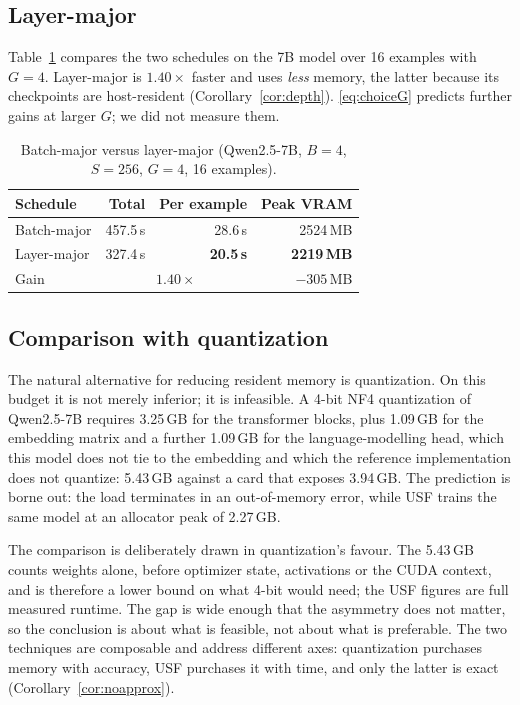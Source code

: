\documentclass[preprint,12pt]{elsarticle}
\newcommand{\usf}{USF}
\begin{document}
\subsection{Layer-major}

Table~\ref{tab:lm} compares the two schedules on the 7B model over 16 examples with $G=4$. Layer-major
is $1.40\times$ faster and uses \emph{less} memory, the latter because its checkpoints are
host-resident (Corollary~\ref{cor:depth}). \eqref{eq:choiceG} predicts further gains at larger $G$; we did
not measure them.

\begin{table}[t]
\centering
\caption{Batch-major versus layer-major (Qwen2.5-7B, $B{=}4$, $S{=}256$, $G{=}4$, 16 examples).}
\label{tab:lm}
\footnotesize
\begin{tabular}{@{}lrrr@{}}
\toprule
\textbf{Schedule} & \textbf{Total} & \textbf{Per example} & \textbf{Peak VRAM} \\
\midrule
Batch-major & 457.5\,s & 28.6\,s & 2524\,MB \\
Layer-major & 327.4\,s & \textbf{20.5\,s} & \textbf{2219\,MB} \\
\midrule
Gain & \multicolumn{2}{c}{$\mathbf{1.40\times}$} & $-305$\,MB \\
\bottomrule
\end{tabular}
\end{table}

\subsection{Comparison with quantization}
\label{sec:quant}

The natural alternative for reducing resident memory is quantization. On this budget it is not
merely inferior; it is infeasible. A 4-bit NF4 quantization of Qwen2.5-7B requires 3.25\,GB for the
transformer blocks, plus 1.09\,GB for the embedding matrix and a further 1.09\,GB for the
language-modelling head, which this model does not tie to the embedding and which the reference
implementation does not quantize: 5.43\,GB against a card that exposes 3.94\,GB. The prediction is
borne out: the load terminates in an out-of-memory error, while \usf{} trains the same model at
an allocator peak of 2.27\,GB.

The comparison is deliberately drawn in quantization's favour. The 5.43\,GB counts weights alone,
before optimizer state, activations or the CUDA context, and is therefore a lower bound on what
4-bit would need; the \usf{} figures are full measured runtime. The gap is wide enough that the
asymmetry does not matter, so the conclusion is about what is feasible, not about what is
preferable. The two techniques are composable and address different axes:
quantization purchases memory with accuracy, \usf{} purchases it with time, and only the latter is
exact (Corollary~\ref{cor:noapprox}).
\end{document}
